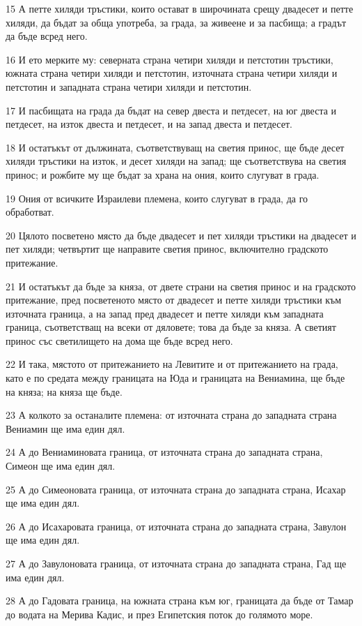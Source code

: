 \par 15 А петте хиляди тръстики, които остават в широчината срещу двадесет и петте хиляди, да бъдат за обща употреба, за града, за живеене и за пасбища; а градът да бъде всред него.
\par 16 И ето мерките му: северната страна четири хиляди и петстотин тръстики, южната страна четири хиляди и петстотин, източната страна четири хиляди и петстотин и западната страна четири хиляди и петстотин.
\par 17 И пасбищата на града да бъдат на север двеста и петдесет, на юг двеста и петдесет, на изток двеста и петдесет, и на запад двеста и петдесет.
\par 18 И остатъкът от дължината, съответствуващ на светия принос, ще бъде десет хиляди тръстики на изток, и десет хиляди на запад; ще съответствува на светия принос; и рожбите му ще бъдат за храна на ония, които слугуват в града.
\par 19 Ония от всичките Израилеви племена, които слугуват в града, да го обработват.
\par 20 Цялото посветено място да бъде двадесет и пет хиляди тръстики на двадесет и пет хиляди; четвъртит ще направите светия принос, включително градското притежание.
\par 21 И остатъкът да бъде за княза, от двете страни на светия принос и на градското притежание, пред посветеното място от двадесет и петте хиляди тръстики към източната граница, а на запад пред двадесет и петте хиляди към западната граница, съответстващ на всеки от дяловете; това да бъде за княза. А светият принос със светилището на дома ще бъде всред него.
\par 22 И така, мястото от притежанието на Левитите и от притежанието на града, като е по средата между границата на Юда и границата на Вениамина, ще бъде на княза; на княза ще бъде.
\par 23 А колкото за останалите племена: от източната страна до западната страна Вениамин ще има един дял.
\par 24 А до Вениаминовата граница, от източната страна до западната страна, Симеон ще има един дял.
\par 25 А до Симеоновата граница, от източната страна до западната страна, Исахар ще има един дял.
\par 26 А до Исахаровата граница, от източната страна до западната страна, Завулон ще има един дял.
\par 27 А до Завулоновата граница, от източната страна до западната страна, Гад ще има един дял.
\par 28 А до Гадовата граница, на южната страна към юг, границата да бъде от Тамар до водата на Мерива Кадис, и през Египетския поток до голямото море.
